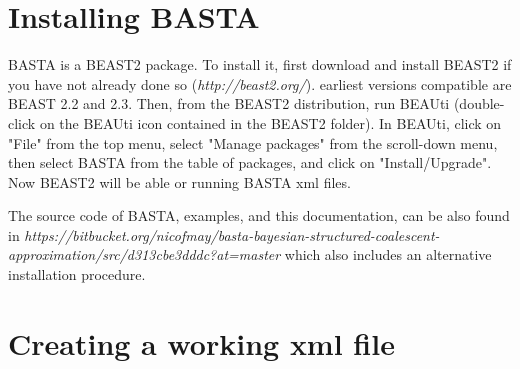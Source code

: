 \documentclass[10pt,letterpaper]{article}
\date{}
\begin{document}
\vspace*{0.35in}


{\Huge
\textbf{}
}
\newline

{\Large
\textbf{}
}
\newline
{
\textbf\newline{\today}
}
\newline



\section{Installing BASTA}

BASTA is a BEAST2 package. 
To install it, first download and install BEAST2 if you have not already done so (\emph{http://beast2.org/}). earliest versions compatible are BEAST 2.2 and 2.3.
Then, from the BEAST2 distribution, run BEAUti (double-click on the BEAUti icon contained in the BEAST2 folder).
In BEAUti, click on "File" from the top menu, select "Manage packages" from the scroll-down menu, then select BASTA from the table of packages, and click on "Install/Upgrade".
Now BEAST2 will be able or running BASTA xml files.

The source code of BASTA, examples, and this documentation, can be also found in  \emph{https://bitbucket.org/nicofmay/basta-bayesian-structured-coalescent-approximation/src/d313cbe3dddc?at=master} which also includes an alternative installation procedure.

\section{Creating a working xml file}
\end{document}
